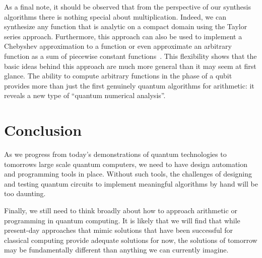 \documentclass[conference]{IEEEtran}
\begin{document}
As a final note, it should be observed that from the perspective of our synthesis algorithms there is nothing special about multiplication.  Indeed, we can synthesize any function that is analytic on a compact domain using the Taylor series approach.  Furthermore, this approach can also be used to implement a Chebyshev approximation to a function or even approximate an arbitrary function as a sum of piecewise constant functions~\cite{WR16}.  This flexibility shows that the basic ideas behind this approach are much more general than it may seem at first glance. The ability to compute arbitrary functions in the phase of a qubit provides more than just the first genuinely quantum algorithms for arithmetic: it reveals a new type of ``quantum numerical analysis''.

\section{Conclusion}
As we progress from today's demonstrations of quantum technologies to tomorrows large scale quantum computers, we need to have 
design automation and programming tools in place.  Without such tools, the challenges of designing and testing quantum circuits to implement meaningful
algorithms by hand will be too daunting. 

 Finally, we still need to think broadly about how to approach arithmetic or programming
in quantum computing.  It is likely that we will find that while present-day approaches that mimic solutions that have been successful for classical computing provide adequate solutions for now,
the solutions of tomorrow may be fundamentally different than anything we can currently imagine.




\end{document}
